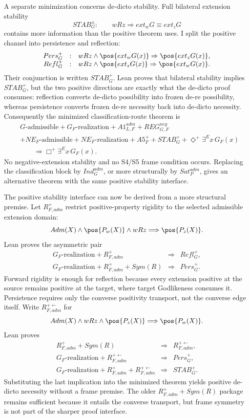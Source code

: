A separate minimization concerns de-dicto stability. Full bilateral extension stability
\[
  STAB_G^{\pm}:\qquad
  wRz\Rightarrow ext_wG\equiv ext_zG
\]
contains more information than the positive theorem uses. I split the positive channel into persistence and reflection:
\[
\begin{array}{rcl}
  Pers_G^+&:&wRz\land \pos{ext_wG(x)}\Rightarrow\pos{ext_zG(x)},\\
  Refl_G^+&:&wRz\land \pos{ext_zG(x)}\Rightarrow\pos{ext_wG(x)}.
\end{array}
\]
Their conjunction is written \(STAB_G^+\). Lean proves that bilateral stability implies \(STAB_G^+\), but the two positive directions are exactly what the de-dicto proof consumes: reflection converts de-dicto possibility into frozen de-re possibility, whereas persistence converts frozen de-re necessity back into de-dicto necessity. Consequently the minimized classification-route theorem is
\[
\begin{split}
  &G\text{-admissible}
  +G_F\text{-realization}
  +A1_{L,F}^{adm}
  +REG_{G,F}^{neg}\\
  &+NE_F\text{-admissible}
  +NE_F\text{-realization}
  +A5_F^+
  +STAB_G^+
  +\Diamond^+\exists^E x\,G_F(x)\\
  &\qquad\Longrightarrow
  \Box^+\exists^E x\,G_F(x).
\end{split}
\]
No negative-extension stability and no S4/S5 frame condition occurs. Replacing the classification block by \(Ind_G^{adm}\), or more structurally by \(Sat_P^{adm}\), gives an alternative theorem with the same positive stability interface.

The positive stability interface can now be derived from a more structural premise. Let \(R_{F,adm}^+\) restrict positive-property rigidity to the selected admissible extension domain:
\[
  Adm(X)\land\pos{P_w(X)}\land wRz
  \Longrightarrow \pos{P_z(X)}.
\]
Lean proves the asymmetric pair
\[
\begin{array}{rcl}
G_F\text{-realization}+R_{F,adm}^+&\Longrightarrow&Refl_G^+,\\
G_F\text{-realization}+R_{F,adm}^++Sym(R)&\Longrightarrow&Pers_G^+.
\end{array}
\]
Forward rigidity is enough for reflection because every extension positive at the source remains positive at the target, where target Godlikeness consumes it. Persistence requires only the converse positivity transport, not the converse edge itself. Write \(R_{F,adm}^{+\leftarrow}\) for
\[
  Adm(X)\land wRz\land\pos{P_z(X)}
  \Longrightarrow \pos{P_w(X)}.
\]
Lean proves
\[
\begin{array}{rcl}
R_{F,adm}^++Sym(R)&\Longrightarrow&R_{F,adm}^{+\leftarrow},\\
G_F\text{-realization}+R_{F,adm}^{+\leftarrow}&\Longrightarrow&Pers_G^+,\\
G_F\text{-realization}+R_{F,adm}^++R_{F,adm}^{+\leftarrow}&\Longrightarrow&STAB_G^+.
\end{array}
\]
Substituting the last implication into the minimized theorem yields positive de-dicto necessity without a frame premise. The older \(R_{F,adm}^++Sym(R)\) package remains sufficient because it entails the converse transport, but frame symmetry is not part of the sharper proof interface.

